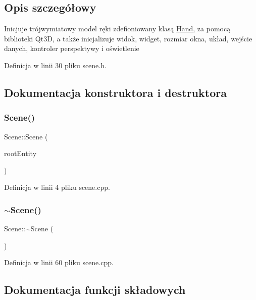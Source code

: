 \subsection{Opis szczegółowy}
Inicjuje trójwymiatowy model ręki zdefioniowany klasą \hyperlink{class_hand}{Hand}, za pomocą biblioteki Qt3D, a także inicjalizuje widok, widget, rozmiar okna, układ, wejście danych, kontroler perspektywy i oświetlenie 

Definicja w linii 30 pliku scene.\+h.



\subsection{Dokumentacja konstruktora i destruktora}
\mbox{\label{class_scene_ae7977c11ac28fa465cedd4889e7cfd58}} 
\subsubsection{\texorpdfstring{Scene()}{Scene()}}
{\footnotesize\ttfamily Scene\+::\+Scene (\begin{DoxyParamCaption}\item[{Qt3\+D\+Core\+::\+Q\+Entity $\ast$}]{root\+Entity }\end{DoxyParamCaption})\hspace{0.3cm}{\ttfamily [explicit]}}



Definicja w linii 4 pliku scene.\+cpp.

\mbox{\label{class_scene_a3b8cec2e32546713915f8c6303c951f1}} 
\subsubsection{\texorpdfstring{$\sim$\+Scene()}{~Scene()}}
{\footnotesize\ttfamily Scene\+::$\sim$\+Scene (\begin{DoxyParamCaption}{ }\end{DoxyParamCaption})}



Definicja w linii 60 pliku scene.\+cpp.



\subsection{Dokumentacja funkcji składowych}
\mbox{\label{class_scene_a53a7f1676ecb6d9b7312e275b3c8256e}} 
